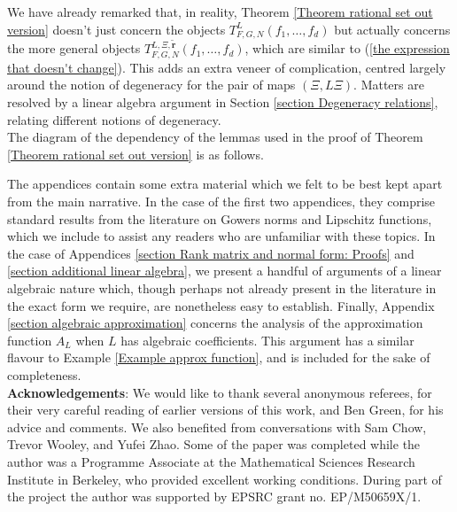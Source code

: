 \documentclass[12pt,a4paper,twoside,reqno]{amsart}
\numberwithin{equation}{section}
\begin{document}
We have already remarked that, in reality, Theorem \ref{Theorem rational set out version} doesn't just concern the objects $T_{F,G,N}^L(f_1,\dots,f_d)$ but actually concerns the more general objects $T_{F,G,N}^{L,\Xi,\widetilde{\mathbf{r}}}(f_1,\dots,f_d)$, which are similar to (\ref{the expression that doesn't change}). This adds an extra veneer of complication, centred largely around the notion of degeneracy for the pair of maps $(\Xi,L\Xi)$. Matters are resolved by a linear algebra argument in Section \ref{section Degeneracy relations}, relating different notions of degeneracy. \\

The diagram of the dependency of the lemmas used in the proof of Theorem \ref{Theorem rational set out version} is as follows. 
 






  \begin{center}
   \end{center}
   \vspace{2mm}


The appendices contain some extra material which we felt to be best kept apart from the main narrative. In the case of the first two appendices, they comprise standard results from the literature on Gowers norms and Lipschitz functions, which we include to assist any readers who are unfamiliar with these topics. In the case of Appendices \ref{section Rank matrix and normal form: Proofs} and \ref{section additional linear algebra}, we present a handful of arguments of a linear algebraic nature which, though perhaps not already present in the literature in the exact form we require, are nonetheless easy to establish. Finally, Appendix \ref{section algebraic approximation} concerns the analysis of the approximation function $A_L$ when $L$ has algebraic coefficients. This argument has a similar flavour to Example \ref{Example approx function}, and is included for the sake of completeness. \\




\noindent \textbf{Acknowledgements}: We would like to thank several anonymous referees, for their very careful reading of earlier versions of this work, and Ben Green, for his advice and comments. We also benefited from conversations with Sam Chow, Trevor Wooley, and Yufei Zhao. Some of the paper was completed while the author was a Programme Associate at the Mathematical Sciences Research Institute in Berkeley, who provided excellent working conditions. During part of the project the author was supported by EPSRC grant no. EP/M50659X/1. \\
\end{document}
